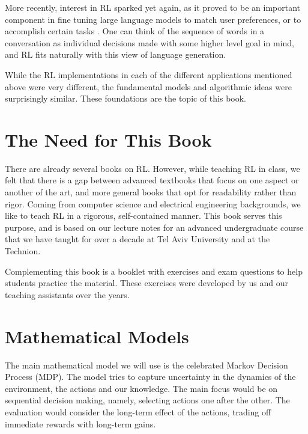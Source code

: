 More recently, interest in RL sparked yet again, as it proved to be an important component in fine tuning large language models to match user preferences, or to accomplish certain tasks \cite{ouyang2022training,zhang2023planning}. One can think of the sequence of words in a conversation as individual decisions made with some higher level goal in mind, and RL fits naturally with this view of language generation.

While the RL implementations in each of the different applications mentioned above were very different, the fundamental models and algorithmic ideas were surprisingly similar. These foundations are the topic of this book.


\section{The Need for This Book}

There are already several books on RL. However, while teaching RL in class, we felt that there is a gap between advanced textbooks that focus on one aspect or another of the art, and more general books that opt for readability rather than rigor. Coming from computer science and electrical engineering backgrounds, we like to teach RL in a rigorous, self-contained manner. This book serves this purpose, and is based on our lecture notes for an advanced undergraduate course that we have taught for over a decade  at Tel Aviv University and at the Technion.

Complementing this book is a booklet with exercises and exam questions to help students practice the material. These exercises were developed by us and our teaching assistants over the years.

\section{Mathematical Models}
%
The main mathematical model we will use is the celebrated Markov Decision Process
(MDP). The model tries to capture uncertainty in the dynamics of the
environment, the actions and our knowledge. The main focus would be
on sequential decision making, namely, selecting actions one after the other. The evaluation would
consider the long-term effect of the actions, trading off immediate
rewards with long-term gains.

